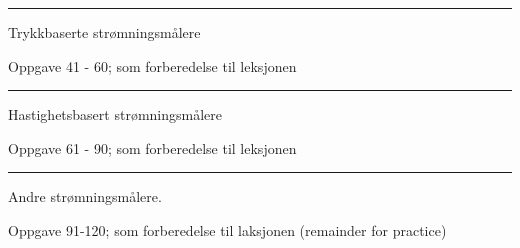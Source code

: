 \vskip 10pt



\filbreak
\hrule \vskip 5pt
\noindent {}

\vskip 5pt


\vskip 2pt  Trykkbaserte strømningsmålere

\vskip 2pt \noindent Oppgave 41 - 60;  som forberedelse til leksjonen%

\vskip 10pt




\filbreak
\hrule \vskip 5pt

\noindent {}

\vskip 5pt



\vskip 2pt  Hastighetsbasert strømningsmålere

\vskip 2pt \noindent Oppgave 61 - 90;  som forberedelse til leksjonen%


%

\filbreak
\hrule \vskip 5pt
\noindent {} 

\vskip 5pt


\vskip 2pt  Andre strømningsmålere. 

\vskip 2pt \noindent Oppgave 91-120;  som forberedelse til laksjonen (remainder for practice)

\vskip 10pt



